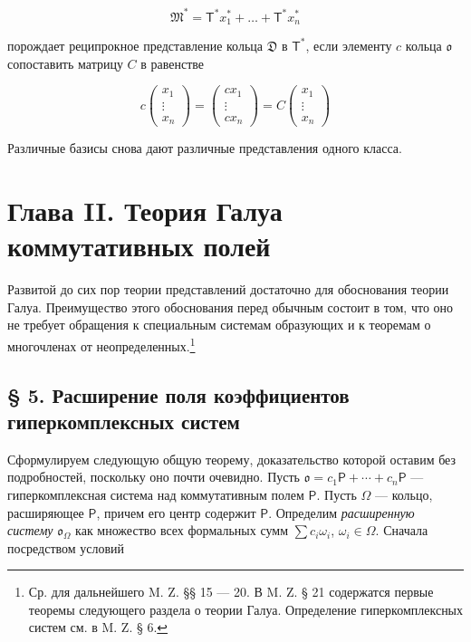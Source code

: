 \documentclass[11pt]{article}
\newcommand{\srcfn}[2]{\footnote{#2}}
\begin{document}
\[\mathfrak{M}^* = \mathsf{T}^* x_1^* + \dots + \mathsf{T}^* x_n^*\]

порождает реципрокное представление кольца \(\mathfrak D\) в \(\mathsf T^*\), если элементу \(c\) кольца \(\mathfrak{o}\) сопоставить матрицу \(C\) в равенстве

\[
c\begin{pmatrix}x_1\\ \vdots\\ x_n\end{pmatrix}
=\begin{pmatrix}cx_1\\ \vdots\\ cx_n\end{pmatrix}
=C\begin{pmatrix}x_1\\ \vdots\\ x_n\end{pmatrix}
\]

Различные базисы снова дают различные представления одного класса.

\section*{Глава II. Теория Галуа коммутативных полей}\label{kapitel-ii.-galoissche-theorie-kommutativer-koerper}

Развитой до сих пор теории представлений достаточно для обоснования теории Галуа. Преимущество этого обоснования перед обычным состоит в том, что оно не требует обращения к специальным системам образующих и к теоремам о многочленах от неопределенных.\srcfn{1}{Ср. для дальнейшего M. Z. §§ 15 --- 20. В M. Z. § 21 содержатся первые теоремы следующего раздела о теории Галуа. Определение гиперкомплексных систем см. в M. Z. § 6.}

\subsection*{§ 5. Расширение поля коэффициентов гиперкомплексных систем}\label{koeffizientenerweiterung-hyperkomplexer-systeme}

Сформулируем следующую общую теорему, доказательство которой оставим без подробностей, поскольку оно почти очевидно. Пусть \(\mathfrak{o}=c_1\mathsf P+\cdots+c_n\mathsf P\) --- гиперкомплексная система над коммутативным полем \(\mathsf P\). Пусть \(\Omega\) --- кольцо, расширяющее \(\mathsf P\), причем его центр содержит \(\mathsf P\). Определим \emph{расширенную систему} \(\mathfrak{o}_{\Omega}\) как множество всех формальных сумм \(\sum c_i\omega_i\), \(\omega_i\in\Omega\). Сначала посредством условий
\end{document}
